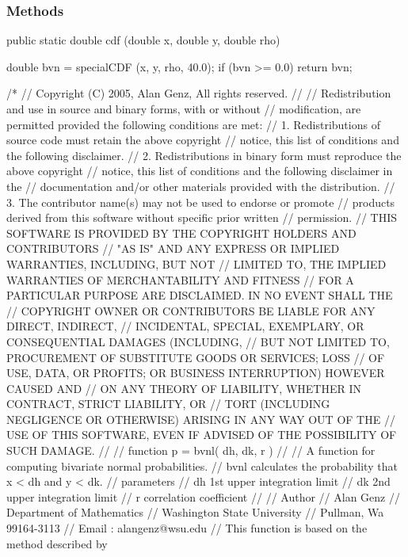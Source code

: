 \subsubsection* {Methods}
\begin{code}

   public static double cdf (double x, double y, double rho) \begin{hide} {
      double bvn = specialCDF (x, y, rho, 40.0);
      if (bvn >= 0.0)
         return bvn;

/*
//   Copyright (C) 2005, Alan Genz,  All rights reserved.
//
//   Redistribution and use in source and binary forms, with or without
//   modification, are permitted provided the following conditions are met:
//     1. Redistributions of source code must retain the above copyright
//        notice, this list of conditions and the following disclaimer.
//     2. Redistributions in binary form must reproduce the above copyright
//        notice, this list of conditions and the following disclaimer in the
//        documentation and/or other materials provided with the distribution.
//     3. The contributor name(s) may not be used to endorse or promote
//        products derived from this software without specific prior written
//        permission.
//   THIS SOFTWARE IS PROVIDED BY THE COPYRIGHT HOLDERS AND CONTRIBUTORS
//   "AS IS" AND ANY EXPRESS OR IMPLIED WARRANTIES, INCLUDING, BUT NOT
//   LIMITED TO, THE IMPLIED WARRANTIES OF MERCHANTABILITY AND FITNESS
//   FOR A PARTICULAR PURPOSE ARE DISCLAIMED. IN NO EVENT SHALL THE
//   COPYRIGHT OWNER OR CONTRIBUTORS BE LIABLE FOR ANY DIRECT, INDIRECT,
//   INCIDENTAL, SPECIAL, EXEMPLARY, OR CONSEQUENTIAL DAMAGES (INCLUDING,
//   BUT NOT LIMITED TO, PROCUREMENT OF SUBSTITUTE GOODS OR SERVICES; LOSS
//   OF USE, DATA, OR PROFITS; OR BUSINESS INTERRUPTION) HOWEVER CAUSED AND
//   ON ANY THEORY OF LIABILITY, WHETHER IN CONTRACT, STRICT LIABILITY, OR
//   TORT (INCLUDING NEGLIGENCE OR OTHERWISE) ARISING IN ANY WAY OUT OF THE
//   USE OF THIS SOFTWARE, EVEN IF ADVISED OF THE POSSIBILITY OF SUCH DAMAGE.
//
//   function p = bvnl( dh, dk, r )
//
//  A function for computing bivariate normal probabilities.
//  bvnl calculates the probability that x < dh and y < dk.
//    parameters
//      dh 1st upper integration limit
//      dk 2nd upper integration limit
//      r   correlation coefficient
//
//   Author
//       Alan Genz
//       Department of Mathematics
//       Washington State University
//       Pullman, Wa 99164-3113
//       Email : alangenz@wsu.edu
//   This function is based on the method described by
}
\end{hide}
\end{code}
